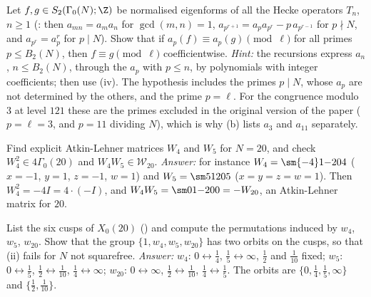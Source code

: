 \begin{exercise}\label{ex:modforms:ex-primes-to-n}
Let $f,g\in S_2(\Gamma_0(N);\Z)$ be normalised eigenforms of all the Hecke operators $T_n$, $n\ge1$ (: then $a_{mn}=a_ma_n$ for $\gcd(m,n)=1$,
$a_{p^{r+1}}=a_pa_{p^r}-p\,a_{p^{r-1}}$ for $p\nmid N$, and $a_{p^r}=a_p^r$ for $p\mid N$). Show that if $a_p(f)\equiv a_p(g)\pmod\ell$ for all primes $p\le B_2(N)$, then $f\equiv g\pmod\ell$
coefficientwise.
\emph{Hint:} the recursions express $a_n$, $n\le B_2(N)$, through the $a_p$ with $p\le n$, by polynomials with integer coefficients; then use (iv). The
hypothesis includes the primes $p\mid N$, whose $a_p$ are not determined by the others, and the prime $p=\ell$. For the congruence modulo $3$ at level $121$ these are the primes
excluded in the original version of the paper ($p=\ell=3$, and $p=11$ dividing $N$), which is why (b) lists $a_3$ and $a_{11}$ separately.
\end{exercise}

\begin{exercise}\label{ex:modforms:ex-al-existence}
Find explicit Atkin-Lehner matrices $W_4$ and $W_5$ for $N=20$, and check $W_4^2\in4\Gamma_0(20)$ and $W_4W_5\in\mathcal W_{20}$.
\emph{Answer:} for instance $W_4=\sm{-4}1{-20}4$ ($x=-1$, $y=1$, $z=-1$, $w=1$) and $W_5=\sm51{20}5$ ($x=y=z=w=1$). Then $W_4^2=-4I=4\cdot(-I)$, and
$W_4W_5=\sm01{-20}0=-W_{20}$, an Atkin-Lehner matrix for $20$.
\end{exercise}

\begin{exercise}\label{ex:modforms:ex-cusps20}
List the six cusps of $X_0(20)$ () and compute the permutations induced by $w_4$, $w_5$, $w_{20}$. Show that the group $\{1,w_4,w_5,w_{20}\}$ has two orbits on the
cusps, so that (ii) fails for $N$ not squarefree.
\emph{Answer:} $w_4$: $0\leftrightarrow\frac14$, $\frac15\leftrightarrow\infty$, $\frac12$ and $\frac1{10}$ fixed; $w_5$: $0\leftrightarrow\frac15$, $\frac12\leftrightarrow\frac1{10}$, $\frac14\leftrightarrow\infty$; $w_{20}$:
$0\leftrightarrow\infty$, $\frac12\leftrightarrow\frac1{10}$, $\frac14\leftrightarrow\frac15$. The orbits are $\{0,\frac14,\frac15,\infty\}$ and $\{\frac12,\frac1{10}\}$.
\end{exercise}

